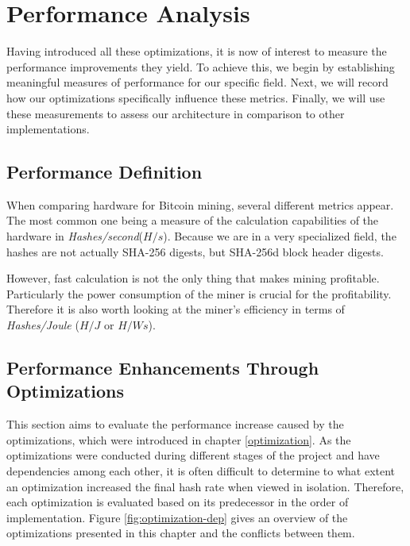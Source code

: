 \section{Performance Analysis}

Having introduced all these optimizations, it is now of interest to measure the performance improvements they yield.
To achieve this, we begin by establishing meaningful measures of performance for our specific field. 
Next, we will record how our optimizations specifically influence these metrics.
Finally, we will use these measurements to assess our architecture in comparison to other implementations.

\subsection{Performance Definition}

When comparing hardware for Bitcoin mining, several different metrics appear. 
The most common one being a measure of the calculation capabilities of the hardware in \textit{Hashes/second}($H/s$).
Because we are in a very specialized field, the hashes are not actually SHA-256 digests, but SHA-256d block header digests.

However, fast calculation is not the only thing that makes mining profitable. Particularly the power consumption of the miner is crucial for the profitability.
Therefore it is also worth looking at the miner's efficiency in terms of \textit{Hashes/Joule} ($H/J$ or $H/Ws$).

\subsection{Performance Enhancements Through Optimizations}


This section aims to evaluate the performance increase caused by the optimizations, which were introduced in chapter \ref{optimization}. As the optimizations were conducted during different stages of the project and have dependencies among each other, it is often difficult to determine to what extent an optimization increased the final hash rate when viewed in isolation. Therefore, each optimization is evaluated based on its predecessor in the order of implementation. Figure \ref{fig:optimization-dep} gives an overview of the optimizations presented in this chapter and the conflicts between them.

